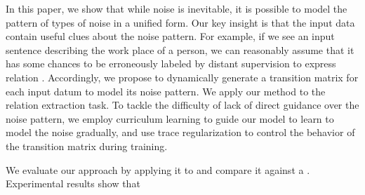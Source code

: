 In this paper, we show that while noise is inevitable, it is possible to model the pattern of   types of noise in a unified form.  Our key insight is that the input data contain useful clues about the noise pattern. For example, if we see an input sentence describing the work place of a person, we can reasonably assume that it has some chances to be erroneously labeled by distant supervision to express relation  . 
Accordingly, we propose to dynamically generate a transition matrix for each input datum to model its noise pattern. We apply our method to the relation extraction task. To tackle the difficulty of lack of direct guidance over the noise pattern, we employ curriculum learning to guide our model to learn to model the noise gradually, and use trace regularization to control the behavior of the transition matrix during training. %

We evaluate our approach by applying it to  and compare it against a
. Experimental results show that 
